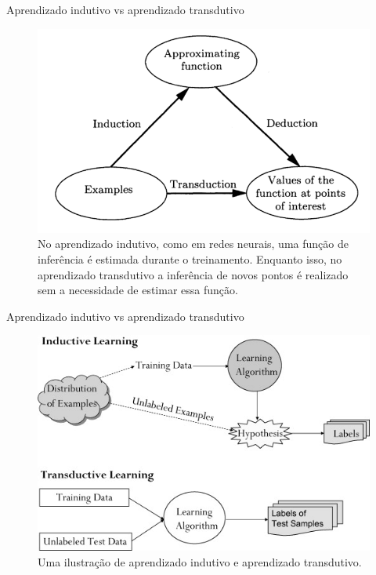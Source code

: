 \documentclass{templatebeamerufc/libs/ufc_format}
\begin{document}
\begin{frame}{Aprendizado indutivo vs aprendizado transdutivo}
  \begin{figure}\label{fig:induction-vs-transudciton-cropped}
    \centering
    \caption{
      No aprendizado indutivo, como em redes neurais, uma função de
inferência é estimada durante o treinamento. Enquanto isso,
no aprendizado transdutivo a inferência de novos pontos é realizado sem a
necessidade de estimar essa função.
}
    \includegraphics[scale=0.42]{figuras/induction_vs_transduction_cropped}
  \end{figure}
\end{frame}

\begin{frame}{Aprendizado indutivo vs aprendizado transdutivo}
  \begin{figure}\label{fig:transductive-vs-inductive}
    \centering
    \caption{ Uma ilustração de aprendizado indutivo e aprendizado
      transdutivo.  }
    \includegraphics[scale=0.75]{figuras/transductive-vs-inductive}
  \end{figure}
\end{frame}
\end{document}
